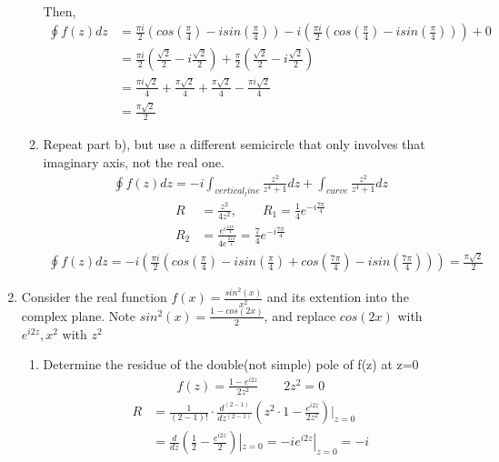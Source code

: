 \documentclass[12pt]{article}
\begin{document}
\begin{enumerate}
\begin{enumerate}
\begin{align*}
	\end{align*}
	Then,
	\begin{align*}
		\oint f(z)dz &= \frac{\pi i}{2}(cos(\frac{\pi}{4})-isin(\frac{\pi}{4}))-i(\frac{\pi i}{2}(cos(\frac{\pi}{4})-isin(\frac{\pi}{4})))+0\\
			     &=\frac{\pi i}{2}(\frac{\sqrt{2}}{2}-i \frac{\sqrt{2}}{2})+\frac{\pi}{2}(\frac{\sqrt{2}}{2}-i \frac{\sqrt{2}}{2})\\
			     &= \frac{\pi i \sqrt{2}}{4}+\frac{\pi \sqrt{2}}{4}+ \frac{\pi \sqrt{2}}{4} - \frac{\pi i \sqrt{2}}{4}\\
			     &=\frac{\pi \sqrt{2}}{2}
	\end{align*}
	\item Repeat part b), but use a different semicircle that only involves that imaginary axis, not the real one.
\begin{align*}
			        \oint f(z)dz=-i \int_{vertical_line}\frac{z^{2}}{z^{4}+1}dz+\int_{curve}\frac{z^{2}}{z^{4}+1}dz
			    \end{align*}
		\begin{align*}
		    R&= \frac{z^{2}}{4z^{2}}, \qquad R_{1}= \frac{1}{4}e^{-i \frac{7\pi}{4}}\\
		    R_{2}&=\frac{e^{i \frac{14\pi}{4}}}{4e^{\frac{21\pi}{4}}}=\frac{7}{4}e^{-i \frac{7\pi}{4}}
		\end{align*}
		\begin{align*}
		    \oint f(z)dz=-i(\frac{\pi i}{2}(cos(\frac{\pi}{4})-isin(\frac{\pi}{4})+cos(\frac{7\pi}{4})-isin(\frac{7\pi}{4})))= \frac{\pi \sqrt{2}}{2}
		\end{align*}
	\end{enumerate}

	\item Consider the real function $f(x) = \frac{sin^{2}(x)}{x^{2}}$ and its extention into the complex plane. Note $sin^{2}(x) = \frac{1-cos(2x)}{2}$, and replace $cos(2x)$ with $e^{i2z}, x^{2}$ with $z^{2}$
		\begin{enumerate}


		    \item Determine the residue of the double(not simple) pole of f(z) at z=0
			    \begin{align*}
			        f(z)=\frac{1-e^{i2z}}{2z^{2}} \qquad 2z^{2}=0
			    \end{align*}
			    \begin{align*}
				    R&=\frac{1}{(2-1)!}\cdot \frac{d^{(2-1)}}{dz^{(2-1)}}(z^{2}\cdot 1-\frac{e^{i2z}}{2z^{2}})|_{z=0}\\
				     &=\frac{d}{dz}(\frac{1}{2}-\frac{e^{i2z}}{2})|_{z=0}=-ie^{i2z}|_{z=0} = -i
			    \end{align*}
			

\end{enumerate}
\end{enumerate}
\end{document}
